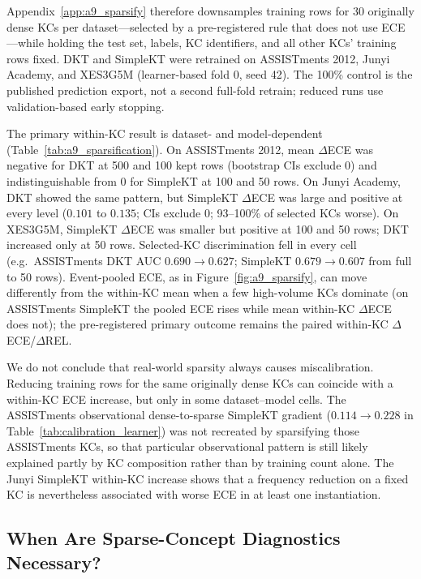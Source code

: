 Appendix~\ref{app:a9_sparsify} therefore downsamples training rows for 30 originally dense KCs per dataset---selected by a pre-registered rule that does not use ECE---while holding the test set, labels, KC identifiers, and all other KCs' training rows fixed. DKT and SimpleKT were retrained on ASSISTments 2012, Junyi Academy, and XES3G5M (learner-based fold 0, seed 42). The 100\% control is the published prediction export, not a second full-fold retrain; reduced runs use validation-based early stopping.

The primary within-KC result is dataset- and model-dependent (Table~\ref{tab:a9_sparsification}). On ASSISTments 2012, mean $\Delta$ECE was negative for DKT at 500 and 100 kept rows (bootstrap CIs exclude 0) and indistinguishable from 0 for SimpleKT at 100 and 50 rows. On Junyi Academy, DKT showed the same pattern, but SimpleKT $\Delta$ECE was large and positive at every level ($0.101$ to $0.135$; CIs exclude 0; 93--100\% of selected KCs worse). On XES3G5M, SimpleKT $\Delta$ECE was smaller but positive at 100 and 50 rows; DKT increased only at 50 rows. Selected-KC discrimination fell in every cell (e.g.\ ASSISTments DKT AUC $0.690\to 0.627$; SimpleKT $0.679\to 0.607$ from full to 50 rows). Event-pooled ECE, as in Figure~\ref{fig:a9_sparsify}, can move differently from the within-KC mean when a few high-volume KCs dominate (on ASSISTments SimpleKT the pooled ECE rises while mean within-KC $\Delta$ECE does not); the pre-registered primary outcome remains the paired within-KC $\Delta$ECE/$\Delta$REL.

We do not conclude that real-world sparsity always causes miscalibration. Reducing training rows for the same originally dense KCs can coincide with a within-KC ECE increase, but only in some dataset--model cells. The ASSISTments observational dense-to-sparse SimpleKT gradient ($0.114\to 0.228$ in Table~\ref{tab:calibration_learner}) was not recreated by sparsifying those ASSISTments KCs, so that particular observational pattern is still likely explained partly by KC composition rather than by training count alone. The Junyi SimpleKT within-KC increase shows that a frequency reduction on a fixed KC is nevertheless associated with worse ECE in at least one instantiation.

\subsection{When Are Sparse-Concept Diagnostics Necessary?}
\label{sec:a8_when_needed}

